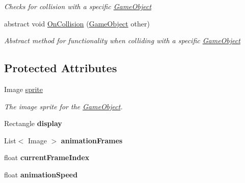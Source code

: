 \begin{DoxyCompactItemize}
\begin{DoxyCompactList}\small\item\em Checks for collision with a specific \hyperlink{class_mage_twinstick_1_1_game_object}{Game\+Object} \end{DoxyCompactList}\item 
abstract void \hyperlink{class_mage_twinstick_1_1_game_object_a60f894a5ff911af7bfe3e4bd8abf253f}{On\+Collision} (\hyperlink{class_mage_twinstick_1_1_game_object}{Game\+Object} other)
\begin{DoxyCompactList}\small\item\em Abstract method for functionality when colliding with a specific \hyperlink{class_mage_twinstick_1_1_game_object}{Game\+Object} \end{DoxyCompactList}\end{DoxyCompactItemize}
\subsection*{Protected Attributes}
\begin{DoxyCompactItemize}
\item 
\hypertarget{class_mage_twinstick_1_1_game_object_a0d553d62b8d1e865b6f106c6b3b110fe}{}Image \hyperlink{class_mage_twinstick_1_1_game_object_a0d553d62b8d1e865b6f106c6b3b110fe}{sprite}\label{class_mage_twinstick_1_1_game_object_a0d553d62b8d1e865b6f106c6b3b110fe}

\begin{DoxyCompactList}\small\item\em The image sprite for the \hyperlink{class_mage_twinstick_1_1_game_object}{Game\+Object}. \end{DoxyCompactList}\item 
\hypertarget{class_mage_twinstick_1_1_game_object_a5807df7f837dc87c8955a008d0b27b50}{}Rectangle {\bfseries display}\label{class_mage_twinstick_1_1_game_object_a5807df7f837dc87c8955a008d0b27b50}

\item 
\hypertarget{class_mage_twinstick_1_1_game_object_a8cc6f0911171f56d011803b3ab70a7b5}{}List$<$ Image $>$ {\bfseries animation\+Frames}\label{class_mage_twinstick_1_1_game_object_a8cc6f0911171f56d011803b3ab70a7b5}

\item 
\hypertarget{class_mage_twinstick_1_1_game_object_a5a94b322db89e1230005a33f1205e742}{}float {\bfseries current\+Frame\+Index}\label{class_mage_twinstick_1_1_game_object_a5a94b322db89e1230005a33f1205e742}

\item 
\hypertarget{class_mage_twinstick_1_1_game_object_a5d21c31402c27c5a19f2a62d98720456}{}float {\bfseries animation\+Speed}\label{class_mage_twinstick_1_1_game_object_a5d21c31402c27c5a19f2a62d98720456}

\end{DoxyCompactItemize}
